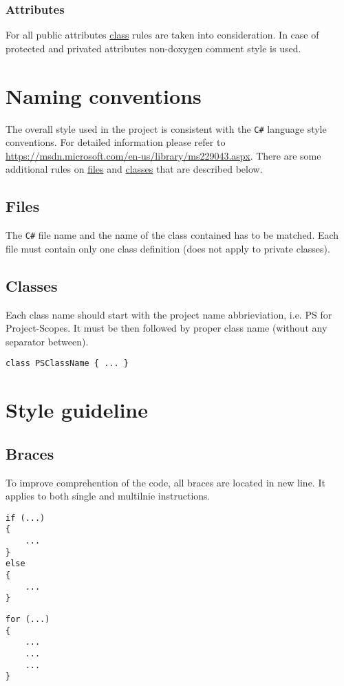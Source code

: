 \documentclass[10pt,a4paper]{article}
\begin{document}
\subsubsection{Attributes}\label{attributes}
\noindent For all public attributes \hyperref[classes]{class} rules are taken into consideration. In case of protected and privated attributes non-doxygen comment style is used.

\section{Naming conventions}
\noindent The overall style used in the project is consistent with the \verb+C#+ language style conventions. For detailed information please refer to \url{https://msdn.microsoft.com/en-us/library/ms229043.aspx}. There are some additional rules on \hyperref[file-name]{files} and \hyperref[class-name]{classes} that are described below.
\subsection{Files}\label{file-name}
\noindent The \verb+C#+ file name and the name of the class contained has to be matched. Each file must contain only one class definition (does not apply to private classes).
\subsection{Classes}\label{class-name}
\noindent Each class name should start with the project name abbrieviation, i.e. PS for Project-Scopes. It must be then followed by proper class name (without any separator between).
\begin{Verbatim}[frame=single]
class PSClassName { ... }
\end{Verbatim}
\section{Style guideline}
\subsection{Braces}
\noindent To improve comprehention of the code, all braces are located in new line. It applies to both single and multilnie instructions.
\begin{Verbatim}[frame=single]
if (...)
{
	...
}
else
{
	...
}
\end{Verbatim}
\begin{Verbatim}[frame=single]
for (...)
{
	...
	...
	...
}
\end{Verbatim}
\end{document}

